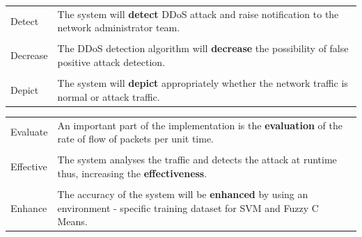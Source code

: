 \documentclass[12pt,a4paper,final]{report}
\begin{document}
\vspace*{1cm}
\begin{center}
\begin{tabular}{|m{2cm}|m{7cm}|}
\hline

Detect & The system will \textbf{detect} DDoS attack and raise notification to the network administrator team. \\

&\\

Decrease & The DDoS detection algorithm will \textbf{decrease} the possibility of false positive attack detection. \\

&\\

Depict & The system will \textbf{depict} appropriately whether the network traffic is normal or attack traffic. \\

\hline
\end{tabular}
\end{center}

\newpage
\begin{center}
\begin{tabular}{|m{2cm}|m{7cm}|}
\hline

Evaluate & An important part of the implementation is the \textbf{evaluation} of the rate of flow of packets per unit time. \\

&\\

Effective & The system analyses the traffic and detects the attack at runtime thus, increasing the \textbf{effectiveness}. \\

&\\

Enhance & The accuracy of the system will be \textbf{enhanced} by using an environment - specific training dataset for SVM and Fuzzy C Means. \\

\hline
\end{tabular}
\end{center}
\end{document}
